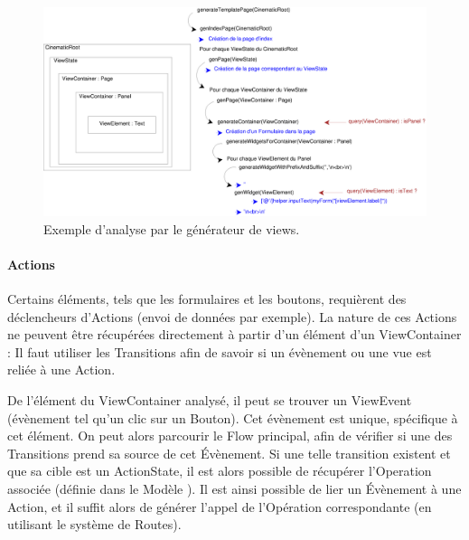 \begin{figure}[H]
  \centering
  \includegraphics[scale=.35]{img/viewexample.eps}
  \caption{Exemple d'analyse par le générateur de views.}
  \label{fig:ex_view}
\end{figure}

\paragraph{Actions}
Certains éléments, tels que les formulaires et les boutons, requièrent des déclencheurs d'Actions (envoi de données par exemple). La nature de ces Actions ne peuvent être récupérées directement à partir d'un élément d'un ViewContainer : Il faut utiliser les Transitions afin de savoir si un évènement ou une vue est reliée à une Action.

De l'élément du ViewContainer analysé, il peut se trouver un ViewEvent (évènement tel qu'un clic sur un Bouton). Cet évènement est unique, spécifique à cet élément. On peut alors parcourir le Flow principal, afin de vérifier si une des Transitions prend sa source de cet Évènement. Si une telle transition existent et que sa cible est un ActionState, il est alors possible de récupérer l'Operation associée (définie dans le Modèle \kwsoa). Il est ainsi possible de lier un Évènement à une Action, et il suffit alors de générer l'appel de l'Opération correspondante (en utilisant le système de Routes).

